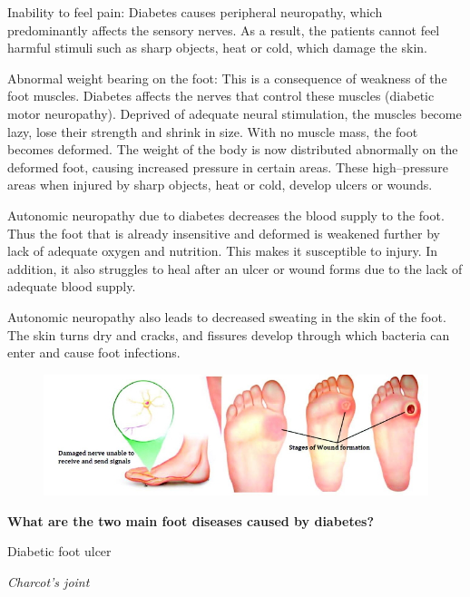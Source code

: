 \item Inability to feel pain: Diabetes causes peripheral neuropathy, which predominantly affects the sensory nerves. As a result, the patients cannot feel harmful stimuli such as sharp objects, heat or cold, which damage the skin.

 \item Abnormal weight bearing on the foot: This is a consequence of weakness of the foot muscles. Diabetes affects the nerves that control these muscles (diabetic motor neuropathy). Deprived of adequate neural stimulation, the muscles become lazy, lose their strength and shrink in size. With no muscle mass, the foot becomes deformed. The weight of the body is now distributed abnormally on the deformed foot, causing increased pressure in certain areas. These high–pressure areas when injured by sharp objects, heat or cold, develop ulcers or wounds.

 \item Autonomic neuropathy due to diabetes decreases the blood supply to the foot. Thus the foot that is already insensitive and deformed is weakened further by lack of adequate oxygen and nutrition. This makes it susceptible to injury. In addition, it also struggles to heal after an ulcer or wound forms due to the lack of adequate blood supply.

 \item Autonomic neuropathy also leads to decreased sweating in the skin of the foot. The skin turns dry and cracks, and fissures develop through which bacteria can enter and cause foot infections.


\begin{figure}
\includegraphics{images/057.jpg}
\end{figure}

\textbf{What are the two main foot diseases caused by diabetes?}

\item Diabetic foot ulcer

 \item \textit{Charcot’s joint}

